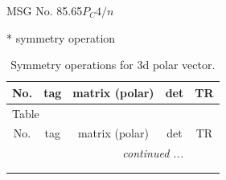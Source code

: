 \documentclass[fleqn,8pt]{jsarticle}
\begin{document}
\setcounter{MaxMatrixCols}{32}

\renewcommand{\tablename}{Table~}
\renewcommand{\figurename}{Figure~}
\begin{center}
\LARGE
MSG No. 85.65\quad$P_{C}4/n$
\end{center}
* symmetry operation
\renewcommand{\arraystretch}{1.3}
\begin{longtable}{ccccc}
\caption{Symmetry operations for 3d polar vector.}
 \\
 \hline \hline
No. & tag & matrix (polar) & det & TR \\ \hline \endfirsthead

\multicolumn{4}{l}{\tablename\ \thetable{}} \\
 \hline \hline
No. & tag & matrix (polar) & det & TR \\ \hline \endhead

 \hline \hline
\multicolumn{4}{r}{\footnotesize\it continued ...} \\ \endfoot

 \hline \hline
\multicolumn{4}{r}{} \\ \endlastfoot


\end{longtable}
\end{document}
